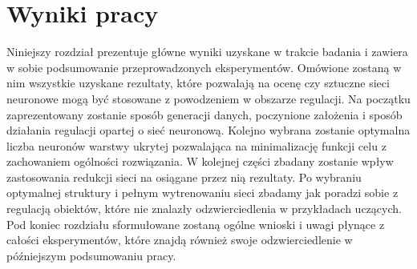 \newpage %
\section{Wyniki pracy}
Niniejszy rozdział prezentuje główne wyniki uzyskane w trakcie badania i zawiera w sobie podsumowanie przeprowadzonych eksperymentów. Omówione zostaną w nim wszystkie uzyskane rezultaty, które pozwalają na ocenę czy sztuczne sieci neuronowe mogą być stosowane z powodzeniem w obszarze regulacji. Na początku zaprezentowany zostanie sposób generacji danych, poczynione założenia i sposób działania regulacji opartej o sieć neuronową. Kolejno wybrana zostanie optymalna liczba neuronów warstwy ukrytej pozwalająca na minimalizację funkcji celu z zachowaniem ogólności rozwiązania. W kolejnej części zbadany zostanie wpływ zastosowania redukcji sieci na osiągane przez nią rezultaty. Po wybraniu optymalnej struktury i pełnym wytrenowaniu sieci zbadamy jak poradzi sobie z regulacją obiektów, które nie znalazły odzwierciedlenia w przykładach uczących. Pod koniec rozdziału sformułowane zostaną ogólne wnioski i uwagi płynące z całości eksperymentów, które znajdą również swoje odzwierciedlenie w późniejszym podsumowaniu pracy.

